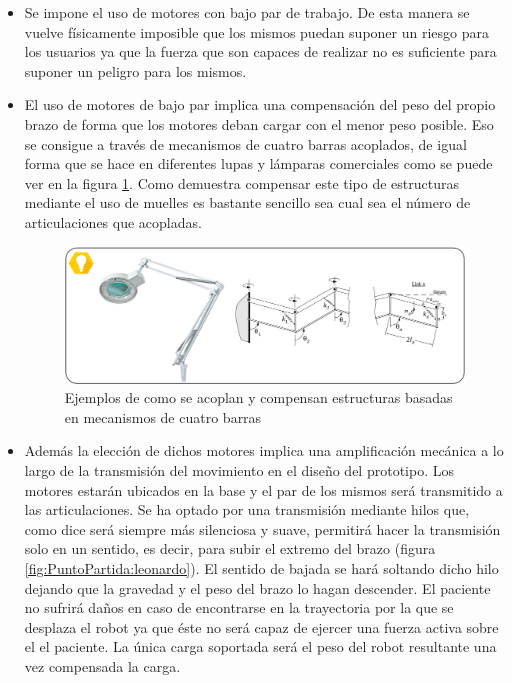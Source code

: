 \begin{itemize}
    \item Se impone el uso de motores con bajo par de trabajo. De esta manera se vuelve físicamente imposible que los mismos puedan suponer un riesgo para los usuarios ya que la fuerza que son capaces de realizar no es suficiente para suponer un peligro para los mismos.
    \item El uso de motores de bajo par implica una compensación del peso del propio brazo de forma que los motores deban cargar con el menor peso posible. Eso se consigue a través de mecanismos de cuatro barras acoplados, de igual forma que se hace en diferentes lupas y lámparas comerciales como se puede ver en la figura \ref{fig:PuntoPartida:CuatroBarras}. Como demuestra \cite{Rahman_asimple} compensar este tipo de estructuras mediante el uso de muelles es bastante sencillo sea cual sea el número de articulaciones que acopladas.
    \begin{figure}
    	\centering
    	\includegraphics[width=1\textwidth]{figuras/Imagenes_PuntoPartida/CuatroBarras.jpg}
    	\caption{Ejemplos de como se acoplan y compensan estructuras basadas en mecanismos de cuatro barras}
    	\label{fig:PuntoPartida:CuatroBarras}
    \end{figure}
    \item Además la elección de dichos motores implica una amplificación mecánica a lo largo de la transmisión del movimiento en el diseño del prototipo. Los motores estarán ubicados en la base y el par de los mismos será transmitido a las articulaciones. Se ha optado por una transmisión mediante hilos que, como dice \cite{LeonardoCodice} será siempre más silenciosa y suave, permitirá hacer la transmisión solo en un sentido, es decir, para subir el extremo del brazo (figura \ref{fig:PuntoPartida:leonardo}). El sentido de bajada se hará soltando dicho hilo dejando que la gravedad y el peso del brazo lo hagan descender. El paciente no sufrirá daños en caso de encontrarse en la trayectoria por la que se desplaza el robot ya que éste no será capaz de ejercer una fuerza activa sobre el el paciente. La única carga soportada será el peso del robot resultante una vez compensada la carga.

\end{itemize}
